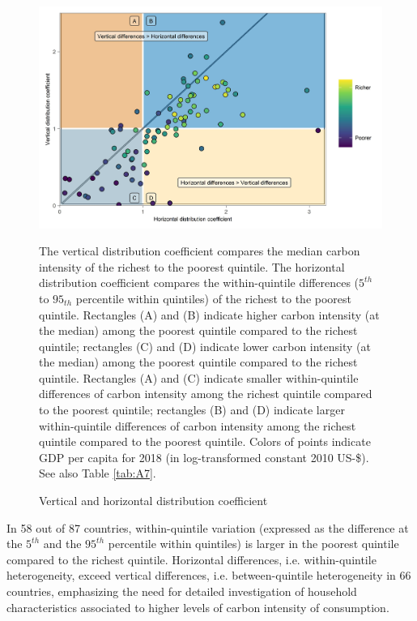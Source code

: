 \documentclass[12pt, a4paper]{article}
\newenvironment{subcaption2}
{\strut
\vspace{-5pt}
\begin{minipage}[b]{0.9\textwidth}
  \hspace*{-\parindent}
  \footnotesize}
 {\end{minipage}}
\begin{document}
\begin{figure}[ht!]
    \centering
    \includegraphics{Figure 2/Figure_2_2017}
    \caption{Vertical and horizontal distribution coefficient}
    \label{fig:fig_2}
    \begin{subcaption2}
    The vertical distribution coefficient compares the median carbon intensity of the richest to the poorest quintile. The horizontal distribution coefficient compares the within-quintile differences ($5^{th}$ to $95_{th}$ percentile within quintiles) of the richest to the poorest quintile. Rectangles (A) and (B) indicate higher carbon intensity (at the median) among the poorest quintile compared to the richest quintile; rectangles (C) and (D) indicate lower carbon intensity (at the median) among the poorest quintile compared to the richest quintile. Rectangles (A) and (C) indicate smaller within-quintile differences of carbon intensity among the richest quintile compared to the poorest quintile; rectangles (B) and (D) indicate larger within-quintile differences of carbon intensity among the richest quintile compared to the poorest quintile. Colors of points indicate GDP per capita for 2018 (in log-transformed constant 2010 US-\$). See also Table \ref{tab:A7}.
    \end{subcaption2}
\end{figure}

In 58 out of 87 countries, within-quintile variation (expressed as the difference at the $5^{th}$ and the $95^{th}$ percentile within quintiles) is larger in the poorest quintile compared to the richest quintile. Horizontal differences, i.e. within-quintile heterogeneity, exceed vertical differences, i.e. between-quintile heterogeneity in 66 countries, emphasizing the need for detailed investigation of household characteristics associated to higher levels of carbon intensity of consumption.
\end{document}
